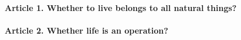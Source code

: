 \documentclass{ucetd}
\begin{document}
\paragraph{Article 1. Whether to live belongs to all natural things?}
\paragraph{Article 2. Whether life is an operation?}
\end{document}
